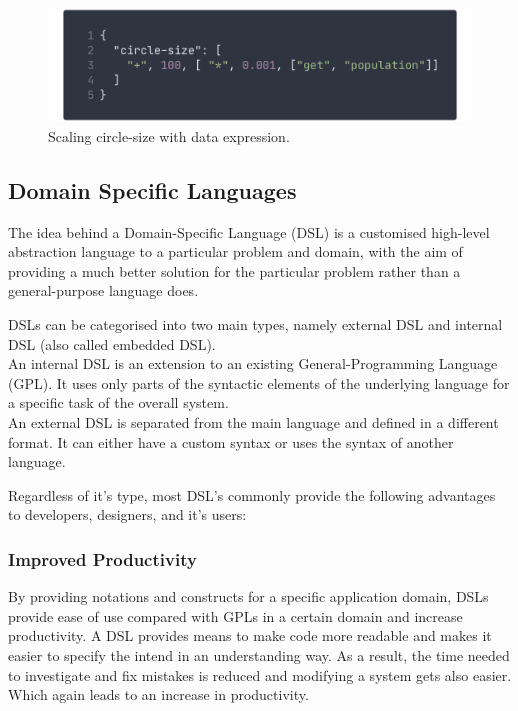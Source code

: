 \documentclass[conference]{IEEEtran}
\begin{document}
\begin{figure}
    \centering
    \includegraphics[width=\columnwidth]{img/circlesize.png}
    \caption{Scaling circle-size with data expression.}
    \label{fig:exp1}
\end{figure}

\subsection{Domain Specific Languages}

The idea behind a Domain-Specific Language (DSL) is a customised high-level abstraction language to a particular problem and domain, with the aim of providing a much better solution for the particular problem rather than a general-purpose language does\cite{van2000domain}.


DSLs can be categorised into two main types, namely  external DSL and internal DSL (also called embedded DSL).  
\\
An internal DSL is an extension to an existing General-Programming Language (GPL). It uses only parts of the syntactic elements
of the underlying language for a specific task of the overall system\cite{fowler2010domain}. 
\\
An external DSL is separated from the main language and defined in a different format. It can either have a custom syntax or uses the syntax of another language\cite{zdun2010dsl}.

Regardless of it's type, most DSL's commonly provide the following advantages to developers, designers, and it's users:

\subsubsection{Improved Productivity}
By providing notations and constructs for a specific application domain, DSLs provide ease of use compared with GPLs in a certain domain and increase productivity\cite{10.1145/1118890.1118892}. A DSL provides means to make code more readable and makes it easier to specify the intend in an understanding way. As a result, the time needed to investigate and fix mistakes is reduced and modifying a system gets also easier. Which again leads to an increase in productivity.
\end{document}
